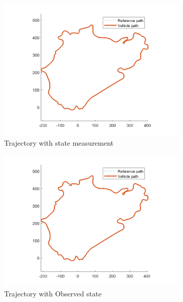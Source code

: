 \begin{figure}[H]
    \centering
     \begin{subfigure}[b]{0.47\textwidth}
         \centering
         \includegraphics[width=\textwidth]{Latex report/image/ex2/trajectory1.png}
         \caption{Trajectory with state measurement}
         \label{fig:traj21}
     \end{subfigure}
     \begin{subfigure}[b]{0.47\textwidth}
         \centering
         \includegraphics[width=\textwidth]{Latex report/image/ex2/trajectory.png}
         \caption{Trajectory with Observed state}
         \label{fig:traj22}
     \end{subfigure}
     \begin{subfigure}[b]{0.47\textwidth}

\end{subfigure}
\end{figure}
